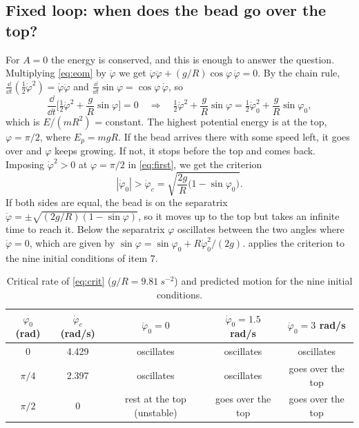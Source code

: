 \documentclass[11pt,a4paper]{article}
\newcommand{\dt}[1]{\dot{#1}}
\newcommand{\ddt}[1]{\ddot{#1}}
\begin{document}
\subsection{Fixed loop: when does the bead go over the top?}\label{sec:crit}
For $A=0$ the energy is conserved, and this is enough to answer the question. Multiplying \cref{eq:eom} by $\dt\varphi$ we get $\dt\varphi\ddt\varphi+(g/R)\cos\varphi\,\dt\varphi=0$. By the chain rule, $\frac{\dd}{\dd t}(\tfrac12\dt\varphi^2)=\dt\varphi\ddt\varphi$ and $\frac{\dd}{\dd t}\sin\varphi=\cos\varphi\,\dt\varphi$, so
\begin{equation}
\frac{\dd}{\dd t}\Big[\tfrac12\dt\varphi^2+\frac gR\sin\varphi\Big]=0\quad\Rightarrow\quad \tfrac12\dt\varphi^2+\frac gR\sin\varphi=\tfrac12\dt\varphi_0^2+\frac gR\sin\varphi_0 ,
\label{eq:first}
\end{equation}
which is $E/(mR^2)$ = constant. The highest potential energy is at the top, $\varphi=\pi/2$, where $E_p=mgR$. If the bead arrives there with some speed left, it goes over and $\varphi$ keeps growing. If not, it stops before the top and comes back. Imposing $\dt\varphi^2>0$ at $\varphi=\pi/2$ in \cref{eq:first}, we get the criterion
\begin{equation}
|\dt\varphi_0|>\dt\varphi_c=\sqrt{\frac{2g}{R}\big(1-\sin\varphi_0\big)} .
\label{eq:crit}
\end{equation}
If both sides are equal, the bead is on the separatrix $\dt\varphi=\pm\sqrt{(2g/R)(1-\sin\varphi)}$, so it moves up to the top but takes an infinite time to reach it. Below the separatrix $\varphi$ oscillates between the two angles where $\dt\varphi=0$, which are given by $\sin\varphi=\sin\varphi_0+R\dt\varphi_0^2/(2g)$.  applies the criterion to the nine initial conditions of item 7.
\begin{table}[htbp]
\centering
\caption{Critical rate of \cref{eq:crit} ($g/R=\SI{9.81}{s^{-2}}$) and predicted motion for the nine initial conditions.}\label{tab:crit}
\begin{tabular}{ccccc}
\toprule
$\varphi_0$ (rad) & $\dt\varphi_c$ (rad/s) & $\dt\varphi_0=0$ & $\dt\varphi_0=1.5$ rad/s & $\dt\varphi_0=3$ rad/s\\
\midrule
$0$ & 4.429 & oscillates & oscillates & oscillates\\
$\pi/4$ & 2.397 & oscillates & oscillates & goes over the top\\
$\pi/2$ & 0 & rest at the top (unstable) & goes over the top & goes over the top\\
\bottomrule
\end{tabular}
\end{table}
\end{document}
